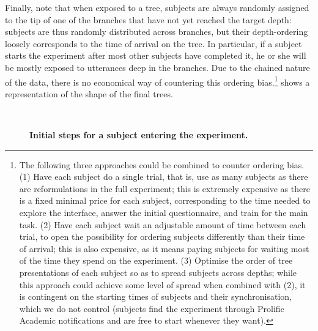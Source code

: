 Finally, note that when exposed to a tree, subjects are always randomly
assigned to the tip of one of the branches that have not yet reached the
target depth: subjects are thus randomly distributed across branches,
but their depth-ordering loosely corresponds to the time of arrival on
the tree. In particular, if a subject starts the experiment after most
other subjects have completed it, he or she will be mostly exposed to
utterances deep in the branches. Due to the chained nature of the data,
there is no economical way of countering this ordering bias.\footnote{The
  following three approaches could be combined to counter ordering bias.
  (1) Have each subject do a single trial, that is, use as many subjects
  as there are reformulations in the full experiment; this is extremely
  expensive as there is a fixed minimal price for each subject,
  corresponding to the time needed to explore the interface, answer the
  initial questionnaire, and train for the main task. (2) Have each
  subject wait an adjustable amount of time between each trial, to open
  the possibility for ordering subjects differently than their time of
  arrival; this is also expensive, as it means paying subjects for
  waiting most of the time they spend on the experiment. (3) Optimise
  the order of tree presentations of each subject so as to spread
  subjects across depths; while this approach could achieve some level
  of spread when combined with (2), it is contingent on the starting
  times of subjects and their synchronisation, which we do not control
  (subjects find the experiment through Prolific Academic notifications
  and are free to start whenever they want).} 
shows a representation of the shape of the final trees.

\begin{figure}[!ht]
  \centering
  ~
  \caption[Initial steps for a subject entering the experiment]{
  \textbf{Initial steps for a subject entering the experiment.}
  }
  \label{fig:gistr-start}
\end{figure}

